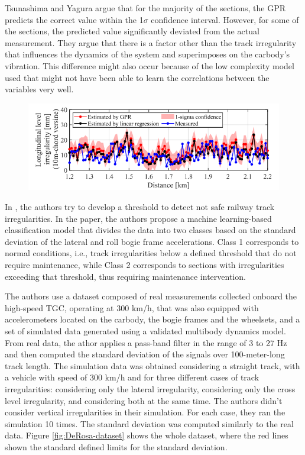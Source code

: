 Tsunashima and Yagura argue that for the majority of the sections, the GPR predicts the correct value within the 1$\sigma$ confidence interval. However, for some of the sections, the predicted value significantly deviated from the actual measurement. They argue that there is a factor other than the track irregularity that influences the dynamics of the system and superimposes on the carbody's vibration. This difference might also occur because of the low complexity model used that might not have been able to learn the correlations between the variables very well. 

\begin{figure}[H]
    \centering
    \includegraphics[width=12cm]{Cap2_LitReview/Track_Quality_Accel/Tsunashina (2024)/Results.png}
    \caption{\cite{vibration7040049}}
    \label{fig:Tsunashina_Results}
\end{figure}

In \cite{DeRosa2021}, the authors try to develop a threshold to detect not safe railway track irregularities. In the paper, the authors propose a machine learning-based classification model that divides the data into two classes based on the standard deviation of the lateral and roll bogie frame accelerations. Class 1 corresponds to normal conditions, i.e., track irregularities below a defined threshold that do not require maintenance, while Class 2 corresponds to sections with irregularities exceeding that threshold, thus requiring maintenance intervention. 

The authors use a dataset composed of real measurements collected onboard the high-speed TGC, operating at 300 km/h, that was also equipped with accelerometers located on the carbody, the bogie frames and the wheelsets, and a set of simulated data generated using a validated multibody dynamics model. From real data, the athor applies a pass-band filter in the range of 3 to 27 Hz and then computed the standard deviation of the signals over 100-meter-long track length. The simulation data was obtained considering a straight track, with a vehicle with speed of 300 km/h and for three different cases of track irregularities: considering only the lateral irregularity, considering only the cross level irregularity, and considering both at the same time. The authors didn't consider vertical irregularities in their simulation. For each case, they ran the simulation 10 times. The standard deviation was computed similarly to the real data. Figure \ref{fig:DeRosa-dataset} shows the whole dataset, where the red lines shown the standard defined limits for the standard deviation.

